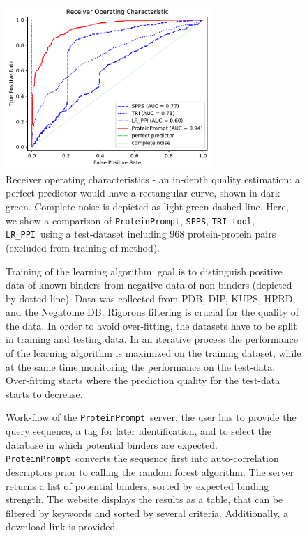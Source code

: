 \documentclass{article}
\newcommand{\spps}{\texttt{SPPS}}
\newcommand{\tri}{\texttt{TRI\_tool}}
\newcommand{\lr}{\texttt{LR\_PPI}}
\newcommand{\tool}{\texttt{ProteinPrompt}}
\begin{document}
\begin{figure}
  \centerline{\includegraphics[width=0.7\textwidth]{img/comparison_roc.pdf}}
  \caption{Receiver operating characteristics - an in-depth quality estimation: a perfect predictor would have a rectangular curve, shown in dark green. Complete noise is depicted as light green dashed line. Here, we show a comparison of \tool, \spps, \tri, \lr\ using a test-dataset including 968 protein-protein pairs (excluded from training of method). }
  \label{fig:comparison}
\end{figure}


\begin{figure}
  
  \caption{ Training of the learning algorithm: goal is to distinguish positive data of known binders from negative data of non-binders (depicted by dotted line). Data was collected from PDB, DIP, KUPS, HPRD, and the Negatome DB. Rigorous filtering is crucial for the quality of the data. In order to avoid over-fitting, the datasets have to be split in training and testing data. In an iterative process the performance of the learning algorithm is maximized on the training dataset, while at the same time monitoring the performance on the test-data. Over-fitting starts where the prediction quality for the test-data starts to decrease.}
  \label{fig:training}
\end{figure}


\begin{figure}
  
  \caption{ Work-flow of the \tool\  server: the user has to provide the query sequence, a tag for later identification, and to select the database in which potential binders are expected. \tool\  converts the sequence first into auto-correlation descriptors prior to calling the random forest algorithm.
    The server returns a list of potential binders, sorted by expected binding strength.
     The website displays the results as a table, that can be filtered by keywords and sorted by several criteria. 
    Additionally, a download link is provided. }
  \label{fig:workflow}
\end{figure}
\end{document}
